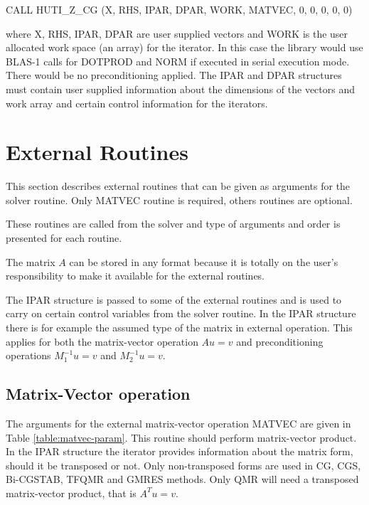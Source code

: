 \documentclass[11pt,a4paper,english,oneside]{report}
\begin{document}
\medskip
\noindent
{\ttfamily CALL HUTI\_Z\_CG (X, RHS, IPAR, DPAR, WORK, MATVEC, 0, 0, 0, 0, 0)}
\medskip

\noindent
where {\ttfamily X, RHS, IPAR, DPAR} are user supplied vectors and
{\ttfamily WORK} is the user allocated work space (an array) for the iterator.
In this case the library would use BLAS-1 calls for {\ttfamily DOTPROD} and
{\ttfamily NORM} if executed in serial execution mode. There would be no
preconditioning applied. The {\ttfamily IPAR} and {\ttfamily DPAR} structures
must contain user supplied information about the dimensions of the vectors
and work array and certain control information for the iterators.

\section{External Routines}

This section describes external routines that can be given as arguments
for the solver routine. Only {\ttfamily MATVEC} routine is required,
others routines are optional.

These routines are called from the solver and type of arguments and order
is presented for each routine.

The matrix $A$ can be stored in any format because it is totally on
the user's responsibility to make it available for the external routines.

The {\ttfamily IPAR} structure is passed to some of the external routines
and is used to carry on certain control variables from the solver routine.
In the {\ttfamily IPAR} structure there is for example the assumed type
of the matrix in external operation. This applies for both the
matrix-vector operation
$Au = v$ and preconditioning operations $M_{1}^{-1}u = v$ and
$M_{2}^{-1}u = v$.

\subsection{Matrix-Vector operation}

The arguments for the external matrix-vector operation {\ttfamily MATVEC}
are given in Table \ref{table:matvec-param}. This routine should perform
matrix-vector product. In the {\ttfamily IPAR} structure the iterator
provides information about the matrix form, should it be transposed or not.
Only non-transposed forms are used in CG, CGS, Bi-CGSTAB, TFQMR and GMRES
methods.
Only QMR will need a transposed matrix-vector product, that is $A^{T}u = v$.
\end{document}
